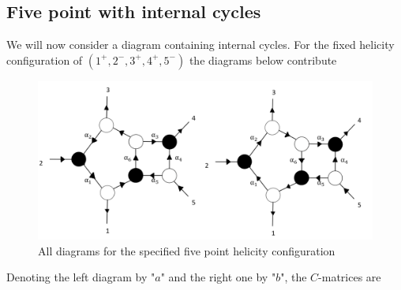 \documentclass[letter,11pt]{article}
\begin{document}
\subsection{Five point with internal cycles}
We will now consider a diagram containing internal cycles. For the fixed helicity configuration of $(1^+,2^-,3^+,4^+,5^-)$ the diagrams below contribute
\begin{figure}[H]
	\centering
	\includegraphics[width=0.7\linewidth]{5pt3}
	\caption{All diagrams for the specified five point helicity configuration}
	\label{fig:5pt}
\end{figure}
\noindent
Denoting the left diagram by "$a$" and the right one by "$b$", the $C$-matrices are
\end{document}
